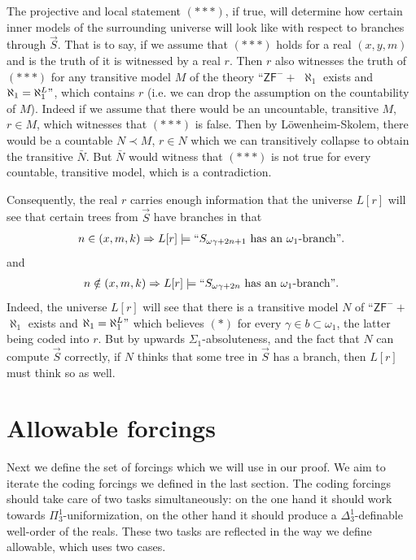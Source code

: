 \documentclass[a4paper,11pt]{article}
\newcommand{\ZFP}{\mathsf{ZF}^-}
\begin{document}
 
 The projective and local statement $({\ast} { \ast} {\ast} )$, if true,  will determine how certain inner models of the surrounding universe will look like with respect to branches through $\vec{S}$.
That is to say, if we assume that $({\ast} { \ast} {\ast} )$ holds for a real $(x,y,m)$ and is the truth of it is witnessed by a real $r$. Then $r$ also witnesses the truth of $({\ast} { \ast} {\ast} )$ for any transitive  model $M$ of  the theory ``$\ZFP+$ $\aleph_1$ exists and $\aleph_1= \aleph_1^L"$,  which contains $r$ (i.e. we can drop the assumption on the countability of $M$).
Indeed if we assume 
that there would be an uncountable, transitive $M$, $r \in M$, which witnesses that $({\ast} { \ast} {\ast} )$ is false. Then by L\"owenheim-Skolem, there would be a countable $N\prec M$, $r\in N$ which we can transitively collapse to obtain the transitive $\bar{N}$. But $\bar{N}$ would witness that $({\ast} { \ast} {\ast} )$ is not true for every countable, transitive model, which is a contradiction.

Consequently, the real $r$ carries enough information that
the universe $L[r]$ will see that certain trees from $\vec{S}$ have branches in that
\begin{align*}
n \in (x,m,k) \Rightarrow L[r] \models  ``S_{\omega \gamma + 2n+1} \text{ has an $\omega_1$-branch}".
\end{align*}
and
\begin{align*}
n \notin (x,m,k) \Rightarrow L[r] \models ``S_{\omega \gamma + 2n} \text{ has an $\omega_1$-branch}".
\end{align*}
Indeed, the universe $L[r]$ will see that there is a transitive model $N$ of ``$\ZFP+$ $\aleph_1$ exists and $\aleph_1=\aleph_1^L"$ which believes $(\ast)$ for every $\gamma \in b\subset \omega_1$, the latter being coded into $r$. But by upwards $\Sigma_1$-absoluteness, and the fact that $N$ can compute $\vec{S}$ correctly, if $N$ thinks that some tree in $\vec{S}$ has a branch, then $L[r]$ must think so as well.

\section{Allowable forcings}

Next we define the set of forcings which we will use in our proof.
We aim to iterate the coding forcings we defined in the last section. The coding forcings should take care of two tasks simultaneously: on the one hand it should work towards $\Pi^1_3$-uniformization, on the other hand it should produce a $\Delta^1_3$-definable well-order of the reals. These two tasks are reflected in the way we define allowable, which uses two cases. 
\end{document}
